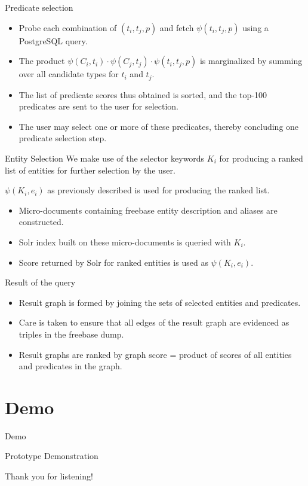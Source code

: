 \documentclass[pdf,11pt]{beamer}
\begin{document}
\begin{frame}{Predicate selection}
\begin{itemize}
\item Probe each combination of $(t_i,t_j,p)$  and fetch $\psi(t_i,t_j,p)$ using a PostgreSQL query.
\item The product $\psi(C_i,t_i) \cdot \psi(C_j,t_j) \cdot \psi(t_i,t_j,p)$ is  marginalized by summing over all candidate types for $t_i$ and $t_j$.

\item The list of predicate scores thus obtained is sorted, and the top-100 predicates are sent to the user for selection.
\item The user may select one or more of these predicates, thereby concluding one predicate selection step.
\end{itemize}
\end{frame}

\begin{frame}{Entity Selection}
We make use of the selector keywords $K_i$ for producing a ranked list of entities for further selection by the user.

$ \psi(K_i,e_i)$ as previously described is used for producing the ranked list.

\begin{itemize}
\item Micro-documents containing freebase entity description and aliases are constructed.
\item Solr index built on these micro-documents is queried with $K_i$.
\item Score returned by Solr for ranked entities is used as $ \psi(K_i,e_i)$.
\end{itemize}
\end{frame}

\begin{frame}{Result of the query}

\begin{itemize}
\item Result graph is formed by joining the sets of selected entities and predicates.
\item Care is taken to  ensure that all edges of the result graph are evidenced as triples in the freebase dump.
\item Result graphs are ranked by graph score = product of scores of all entities and predicates in the graph.
\end{itemize}
\end{frame}


\section{Demo}
\begin{frame}{Demo}

\begin{center}
\huge Prototype Demonstration
\end{center}
\end{frame}


\begin{frame}[plain,c]

\begin{center}
\Huge Thank you for listening!
\end{center}

\end{frame}
\end{document}
